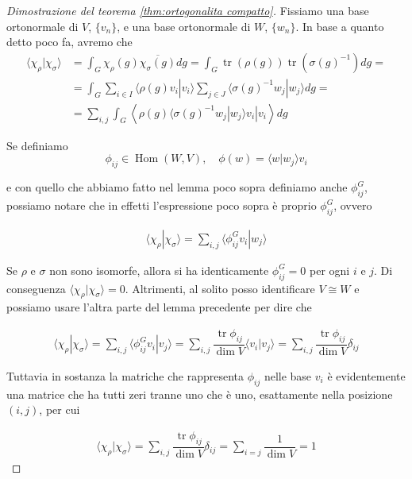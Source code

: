 \documentclass[11pt]{article}
\theoremstyle{plain}
\theoremstyle{definition}
\theoremstyle{remark}
\newcommand{\dsum}{\displaystyle\sum}
\newcommand{\dint}{\displaystyle\int}
\DeclareMathOperator{\tr}{tr}
\DeclareMathOperator{\Hom}{Hom}
\begin{document}
 \begin{proof}[Dimostrazione del teorema \ref{thm:ortogonalita compatto}]
 Fissiamo una base ortonormale di $V$, $\{v_n\}$, e una base ortonormale di $W$, $\{w_n\}$. In base a quanto detto poco fa, avremo che
 \begin{align*}
   \langle \chi_\rho | \chi_\sigma \rangle &= \dint_G \chi_\rho(g) \overline{\chi_\sigma(g)} dg = \dint_G \tr(\rho(g)) \tr(\sigma(g)^{-1}) dg = \\
   &= \dint_G \dsum_{i \in I} \langle \rho(g) v_i | v_i \rangle \dsum_{j \in J} \langle \sigma(g)^{-1} w_j | w_j \rangle dg = \\
   &= \dsum_{i,j} \dint_G \left\langle \rho(g) \langle \sigma(g)^{-1} w_j | w_j \rangle v_i | v_i \right\rangle dg 
 \end{align*} 

 Se definiamo
 \[ \phi_{ij} \in \Hom(W, V), \quad \phi(w) = \langle w | w_j \rangle v_i \]

 e con quello che abbiamo fatto nel lemma poco sopra definiamo anche $\phi^G_{ij}$, possiamo notare che in effetti l'espressione poco sopra è proprio $\phi^G_{ij}$, ovvero

 \begin{align*}
   \langle \chi_\rho | \chi_\sigma \rangle = \dsum_{i,j} \langle \phi_{ij}^G v_i | w_j \rangle
 \end{align*}

 Se $\rho$ e $\sigma$ non sono isomorfe, allora si ha identicamente $\phi_{ij}^G = 0$ per ogni $i$ e $j$. Di conseguenza $\langle \chi_\rho | \chi_\sigma \rangle = 0$. Altrimenti, al solito posso identificare $V \cong W$ e possiamo usare l'altra parte del lemma precedente per dire che

\begin{align*}
   \langle \chi_\rho | \chi_\sigma \rangle = \dsum_{i,j} \langle \phi_{ij}^G v_i | v_j \rangle = \dsum_{i,j} \dfrac{\tr \phi_{ij}}{\dim V} \langle v_i | v_j \rangle = \dsum_{i,j } \dfrac{\tr\phi_{ij}}{\dim V} \delta_{ij} 
 \end{align*}

Tuttavia in sostanza la matriche che rappresenta $\phi_{ij}$ nelle base $v_i$ è evidentemente una matrice che ha tutti zeri tranne uno che è uno, esattamente nella posizione $(i,j)$, per cui


\begin{align*}
   \langle \chi_\rho | \chi_\sigma \rangle = \dsum_{i,j } \dfrac{\tr\phi_{ij}}{\dim V} \delta_{ij} = \dsum_{i=j} \dfrac{1}{\dim V} = 1
 \end{align*}

 \end{proof}
\end{document}

